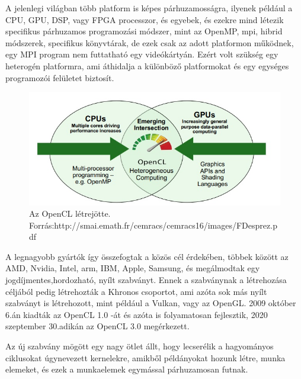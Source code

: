

A jelenlegi világban több platform is képes párhuzamosságra, ilyenek például a CPU, GPU, DSP, vagy FPGA processzor, és egyebek, és ezekre mind létezik specifikus párhuzamos programozási módszer, mint az OpenMP, mpi, hibrid módszerek, specifikus könyvtárak, de ezek csak az adott platformon működnek, egy MPI program nem futtatható egy videókártyán. Ezért volt szükség egy heterogén platformra, ami áthidalja a különböző platformokat és egy egységes programozói felületet biztosít. 

\begin{figure}[h]
\centering
\includegraphics[scale=0.7]{images/opencl_origin.jpg}
\caption{Az OpenCL létrejötte. \\ Forrás:http://smai.emath.fr/cemracs/cemracs16/images/FDesprez.pdf}
\label{fig:openCl}
\end{figure}

A legnagyobb gyártók így összefogtak a közös cél érdekében, többek között az AMD, Nvidia, Intel, arm, IBM, Apple, Samsung, és megálmodtak egy jogdíjmentes,hordozható, nyílt szabványt. Ennek a szabványnak a létrehozása céljából pedig létrehozták a Khronos csoportot, ami azóta sok más nyílt szabványt is létrehozott, mint például a Vulkan, vagy az OpenGL. 2009 október 6.án kiadták az OpenCL 1.0 -át és azóta is folyamatosan fejlesztik, 2020 szeptember 30.adikán az OpenCL 3.0 megérkezett.

Az új szabvány mögött egy nagy ötlet állt, hogy lecserélik a hagyományos ciklusokat úgynevezett kernelekre, amikből példányokat hozunk létre, munka elemeket, és ezek a munkaelemek egymással párhuzamosan futnak.

